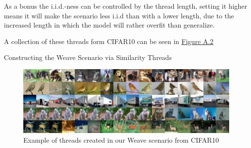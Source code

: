 \documentclass[oneside]{ctuthesis}
\begin{document}
As a bonus the i.i.d.-ness can be controlled by the thread length, setting it higher means it will make the scenario less i.i.d than with a lower length, due to the increased length in which the model will rather overfit than generalize. 

A collection of these threads form CIFAR10 can be seen in \hyperref[fig:weave]{Figure A.2}
\begin{algorithm}[h]
\SetAlgoLined
{}


\caption{Constructing the Weave Scenario via Similarity Threads}
\label{alg:weave}
\end{algorithm}

\begin{figure}[h]
    \centering
    \includegraphics[width=1\linewidth]{figures/weave.png}
    \caption{Example of threads created in our Weave scenario from CIFAR10}
    \label{fig:weave}
\end{figure}



\end{document}
